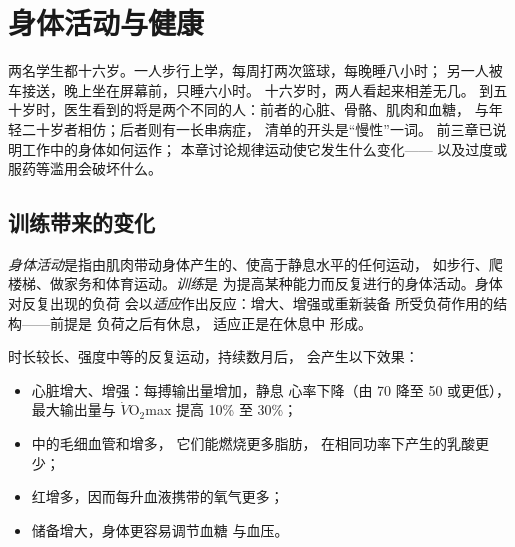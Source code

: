 \chapter{身体活动与健康}\label{ch:g10:sport-and-health}

两名学生都十六岁。一人步行上学，每周打两次篮球，每晚睡八小时；
另一人被车接送，晚上坐在屏幕前，只睡六小时。
十六岁时，两人看起来相差无几。
到五十岁时，医生看到的将是两个不同的人：前者的心脏、骨骼、肌肉和血糖，
与年轻二十岁者相仿；后者则有一长串病症，
清单的开头是“慢性”一词。
前三章已说明工作中的身体如何运作；
本章讨论规律运动使它发生什么变化——
以及过度或服药等滥用会破坏什么。

\section{训练带来的变化}

\begin{definition}[身体活动与训练]\label{def:g10:sport-and-health:training}
\emph{身体活动}是指由肌肉带动身体产生的、使高于静息水平的任何运动，
如步行、爬楼梯、做家务和体育运动。\emph{训练}是
为提高某种能力而反复进行的身体活动。身体对反复出现的负荷
会以\emph{适应}作出反应：增大、增强或重新装备
所受负荷作用的结构——前提是
负荷之后有休息，
适应正是在休息中
形成。
\end{definition}

\begin{proposition}[耐力训练的适应]\label{prop:g10:sport-and-health:endurance}
时长较长、强度中等的反复运动，持续数月后，
会产生以下效果：
\begin{itemize}
  \item 心脏增大、增强：每搏输出量增加，静息
        心率下降（由 70 降至 50 或更低），最大输出量与
        $\dot V\!\mathrm{O_2}$max 提高 10\% 至 30\%；
  \item {}中的毛细血管和增多，
        它们能燃烧更多脂肪，
        在相同功率下产生的乳酸更少；
  \item 红增多，因而每升血液携带的氧气更多；
  \item {}储备增大，身体更容易调节血糖
        与血压。
\end{itemize}
\end{proposition}
\admitted

